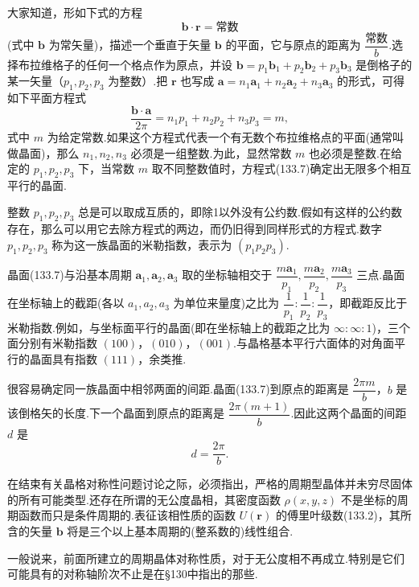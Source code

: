 大家知道，形如下式的方程
\begin{equation*}
  \boldsymbol{b}\cdot\boldsymbol{r}=\text{常数}
\end{equation*}
(式中 $\boldsymbol{b}$ 为常矢量)，描述一个垂直于矢量 $\boldsymbol{b}$ 的平面，它与原点的距离为 $\dfrac{\text{常数}}{b}$.选择布拉维格子的任何一个格点作为原点，并设 $\boldsymbol{b}=p_1\boldsymbol{b}_1+p_2\boldsymbol{b}_2+p_3\boldsymbol{b}_3$ 是倒格子的某一矢量（$p_1,p_2,p_3$ 为整数）.把 $\boldsymbol{r}$ 也写成 $\boldsymbol{a}=n_1\boldsymbol{a}_1+n_2\boldsymbol{a}_2+n_3\boldsymbol{a}_3$ 的形式，可得如下平面方程式
\begin{equation}
  \frac{\boldsymbol{b}\cdot\boldsymbol{a}}{2\pi}
  =n_1p_1+n_2p_2+n_3p_3=m,
\end{equation}
式中 $m$ 为给定常数.如果这个方程式代表一个有无数个布拉维格点的平面(通常叫做晶面)，那么 $n_1,n_2,n_3$ 必须是一组整数.为此，显然常数 $m$ 也必须是整数.在给定的 $p_1,p_2,p_3$ 下，当常数 $m$ 取不同整数值时，方程式(133.7)确定出无限多个相互平行的晶面.

整数 $p_1,p_2,p_3$ 总是可以取成互质的，即除1以外没有公约数.假如有这样的公约数存在，那么可以用它去除方程式的两边，而仍旧得到同样形式的方程式.数字 $p_1,p_2,p_3$ 称为这一族晶面的米勒指数，表示为 $(p_1p_2p_3)$.

晶面(133.7)与沿基本周期 $\boldsymbol{a}_1,\boldsymbol{a}_2,\boldsymbol{a}_3$ 取的坐标轴相交于 $\dfrac{m\boldsymbol{a}_1}{p_1},\dfrac{m\boldsymbol{a}_2}{p_2},\dfrac{m\boldsymbol{a}_3}{p_3}$ 三点.晶面在坐标轴上的截距(各以 $a_1,a_2,a_3$ 为单位来量度)之比为 $\dfrac{1}{p_1}:\dfrac{1}{p_2}:\dfrac{1}{p_3}$，即截距反比于米勒指数.例如，与坐标面平行的晶面(即在坐标轴上的截距之比为 $\infty:\infty:1$)，三个面分别有米勒指数 $(100)$，$(010)$，$(001)$.与晶格基本平行六面体的对角面平行的晶面具有指数 $(111)$，余类推.

很容易确定同一族晶面中相邻两面的间距.晶面(133.7)到原点的距离是 $\dfrac{2\pi m}{b}$，$b$ 是该倒格矢的长度.下一个晶面到原点的距离是 $\dfrac{2\pi(m+1)}{b}$.因此这两个晶面的间距 $d$ 是
\begin{equation}
  d=\frac{2\pi}{b}.
\end{equation}

在结束有关晶格对称性问题讨论之际，必须指出，严格的周期型晶体并未穷尽固体的所有可能类型.还存在所谓的无公度晶相，其密度函数 $\rho(x,y,z)$ 不是坐标的周期函数而只是条件周期的.表征该相性质的函数 $U(\boldsymbol{r})$ 的傅里叶级数(133.2)，其所含的矢量 $\boldsymbol{b}$ 将是三个以上基本周期的(整系数的)线性组合.

一般说来，前面所建立的周期晶体对称性质，对于无公度相不再成立.特别是它们可能具有的对称轴阶次不止是在§130中指出的那些.

